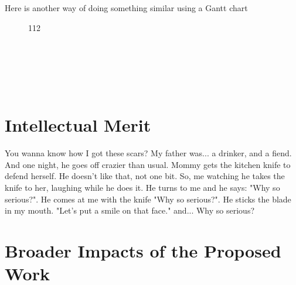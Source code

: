 \documentclass[nsfdescription]{nsfproposal}
\begin{document}
Here is another way of doing something similar using a Gantt chart
\begin{figure}[h]
	\centering
	\begin{ganttchart}[%
		x unit=1cm,
		y unit title=0.5cm,
		y unit chart=0.7cm,
		vgrid,hgrid,
		title height=1,
		title label font=\bfseries\footnotesize,
		bar/.style={fill=blue},
		bar height=0.7,
		group right shift=0,
		group top shift=0.7,
		group height=.3,
		group peaks width={0.2},
		inline]{1}{12} 
			\\
			\\
			\\
			\\		
			
			\\
			\\
		
		\end{ganttchart}
\end{figure}

\section{Intellectual Merit}

You wanna know how I got these scars? My father was... a drinker, and a fiend. And one night, he goes off crazier than usual. Mommy gets the kitchen knife to defend herself. He doesn't like that, not one bit. So, me watching he takes the knife to her, laughing while he does it. He turns to me and he says: "Why so serious?". He comes at me with the knife "Why so serious?". He sticks the blade in my mouth. "Let's put a smile on that face." and... Why so serious?


\section{Broader Impacts of the Proposed Work}
\label{broadimpacts}
\end{document}
